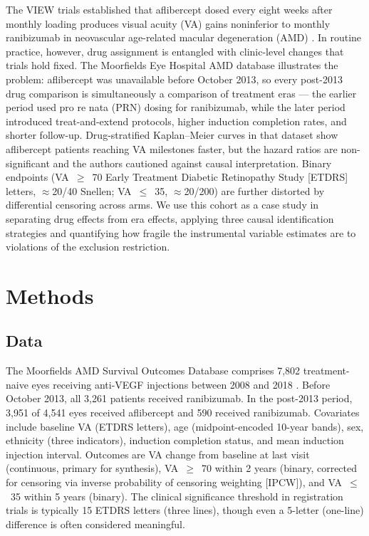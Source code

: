 \documentclass{article}
\begin{document}
The VIEW trials established that aflibercept dosed every eight weeks after monthly loading produces visual acuity (VA) gains noninferior to monthly ranibizumab in neovascular age-related macular degeneration (AMD) \citep{heier2012}. In routine practice, however, drug assignment is entangled with clinic-level changes that trials hold fixed. The Moorfields Eye Hospital AMD database \citep{fu2021, fu2020data} illustrates the problem: aflibercept was unavailable before October 2013, so every post-2013 drug comparison is simultaneously a comparison of treatment eras --- the earlier period used pro re nata (PRN) dosing for ranibizumab, while the later period introduced treat-and-extend protocols, higher induction completion rates, and shorter follow-up. Drug-stratified Kaplan--Meier curves in that dataset show aflibercept patients reaching VA milestones faster, but the hazard ratios are non-significant and the authors cautioned against causal interpretation. Binary endpoints (VA~$\geq$~70 Early Treatment Diabetic Retinopathy Study [ETDRS] letters, $\approx$20/40 Snellen; VA~$\leq$~35, $\approx$20/200) are further distorted by differential censoring across arms. We use this cohort as a case study in separating drug effects from era effects, applying three causal identification strategies and quantifying how fragile the instrumental variable estimates are to violations of the exclusion restriction.

\section{Methods}

\subsection{Data}

The Moorfields AMD Survival Outcomes Database comprises 7,802 treatment-naive eyes receiving anti-VEGF injections between 2008 and 2018 \citep{fu2020data}. Before October 2013, all 3,261 patients received ranibizumab. In the post-2013 period, 3,951 of 4,541 eyes received aflibercept and 590 received ranibizumab. Covariates include baseline VA (ETDRS letters), age (midpoint-encoded 10-year bands), sex, ethnicity (three indicators), induction completion status, and mean induction injection interval. Outcomes are VA change from baseline at last visit (continuous, primary for synthesis), VA~$\geq$~70 within 2 years (binary, corrected for censoring via inverse probability of censoring weighting [IPCW]), and VA~$\leq$~35 within 5 years (binary). The clinical significance threshold in registration trials is typically 15 ETDRS letters (three lines), though even a 5-letter (one-line) difference is often considered meaningful.
\end{document}
